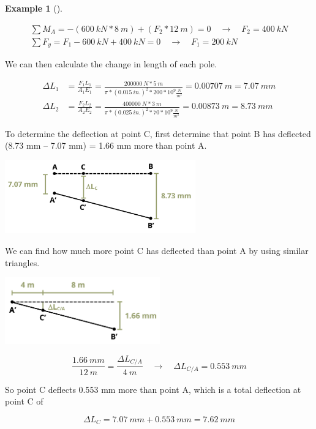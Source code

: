 \documentclass[
  letterpaper,
  DIV=11,
  numbers=noendperiod]{scrreprt}
\theoremstyle{definition}
\newtheorem{example}{Example}[chapter]
\theoremstyle{remark}
\begin{document}
\begin{tcolorbox}
\begin{example}[]
\begin{tcolorbox}
\[
\begin{gathered}
\sum M_A=-(600{~kN}* 8{~m})+(F_2 * 12{~m})=0 \quad\rightarrow\quad F_2=400{~kN} \\
\sum F_y=F_1-600{~kN}+400{~kN}=0 \quad\rightarrow\quad F_1=200{~kN}
\end{gathered}
\]

We can then calculate the change in length of each pole.

\[
\begin{aligned}
\Delta L_1 & =\frac{F_1 L_1}{A_1 E_1}=\frac{200000{~N} * 5{~m}}{\pi * (0.015{~in.})^2 * 200 * 10^9\frac{N}{m^2}}=0.00707{~m}=7.07{~mm} \\
\Delta L_2 & =\frac{F_2 L_2}{A_2 E_2}=\frac{400000{~N} * 3{~m}}{\pi * (0.025{~in.})^2 * 70 * 10^9\frac{N}{m^2}}=0.00873{~m}=8.73{~mm}
\end{aligned}
\]

To determine the deflection at point C, first determine that point B has
deflected (8.73 mm -- 7.07 mm) = 1.66 mm more than point A.

\begin{center}
\includegraphics[width=3.23958in,height=\textheight]{images/PNGs/Example 5.4 part 3.png}
\end{center}

We can find how much more point C has deflected than point A by using
similar triangles.

\begin{center}
\includegraphics[width=2.63542in,height=\textheight]{images/PNGs/Example 5.4 part 4.png}
\end{center}

\[
\frac{1.66{~mm}}{12{~m}}=\frac{\Delta L_{C / A}}{4{~m}} \quad\rightarrow\quad \Delta L_{C / A}=0.553{~mm}
\]

So point C deflects 0.553 mm more than point A, which is a total
deflection at point C of

\[
\Delta L_C=7.07{~mm}+0.553{~mm}=7.62{~mm}
\]

\end{tcolorbox}

\end{example}

\end{tcolorbox}
\end{document}
